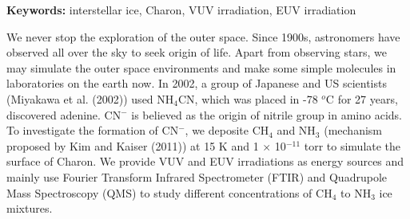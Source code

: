 \begin{abstracten}

{\bf \sf Keywords:} interstellar ice, Charon, VUV irradiation, EUV irradiation

\vspace{2em}

We never stop the exploration of the outer space. Since 1900s, astronomers have observed all over the sky to seek origin of life. Apart from observing stars, we may simulate the outer space environments and make some simple molecules in laboratories on the earth now. In 2002, a group of Japanese and US scientists (Miyakawa et al. (2002)\cite{miyakawa2002cold}) used NH$_4$CN, which was placed in -78 $^o$C for 27 years, discovered adenine. CN$^-$ is believed as the origin of nitrile group in amino acids. To investigate the formation of CN$^-$, we deposite CH$_4$ and NH$_3$ (mechanism proposed by Kim and Kaiser (2011)\cite{kim}) at 15 K and 1 $\times$ 10$^{-11}$ torr to simulate the surface of Charon. We provide VUV and EUV irradiations as energy sources and mainly use Fourier Transform Infrared Spectrometer (FTIR) and Quadrupole Mass Spectroscopy (QMS) to study different concentrations of CH$_4$ to NH$_3$ ice mixtures.

\end{abstracten} 

